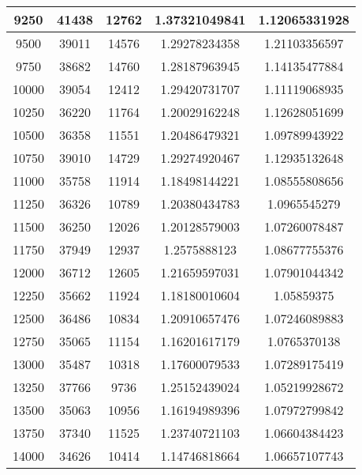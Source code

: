\begin{table}[H]
\begin{tabular}{|c|c|c|c|c|}
		9250    & 41438        & 12762        & 1.37321049841         &  1.12065331928 \\ \hline
		9500    & 39011        & 14576        & 1.29278234358         &  1.21103356597 \\ \hline
		9750    & 38682        & 14760        & 1.28187963945         &  1.14135477884 \\ \hline
		10000   & 39054        & 12412        & 1.29420731707         &  1.11119068935 \\ \hline
		10250   & 36220        & 11764        & 1.20029162248         &  1.12628051699 \\ \hline
		10500   & 36358        & 11551        & 1.20486479321         &  1.09789943922 \\ \hline
		10750   & 39010        & 14729        & 1.29274920467         &  1.12935132648 \\ \hline
		11000   & 35758        & 11914        & 1.18498144221         &  1.08555808656 \\ \hline
		11250   & 36326        & 10789        & 1.20380434783         &  1.0965545279  \\ \hline
		11500   & 36250        & 12026        & 1.20128579003         &  1.07260078487 \\ \hline
		11750   & 37949        & 12937        & 1.2575888123          &  1.08677755376 \\ \hline
		12000   & 36712        & 12605        & 1.21659597031         &  1.07901044342 \\ \hline
		12250   & 35662        & 11924        & 1.18180010604         &  1.05859375    \\ \hline
		12500   & 36486        & 10834        & 1.20910657476         &  1.07246089883 \\ \hline
		12750   & 35065        & 11154        & 1.16201617179         &  1.0765370138  \\ \hline
		13000   & 35487        & 10318        & 1.17600079533         &  1.07289175419 \\ \hline
		13250   & 37766        & 9736         & 1.25152439024         &  1.05219928672 \\ \hline
		13500   & 35063        & 10956        & 1.16194989396         &  1.07972799842 \\ \hline
		13750   & 37340        & 11525        & 1.23740721103         &  1.06604384423 \\ \hline
		14000   & 34626        & 10414        & 1.14746818664         &  1.06657107743 \\ \hline

\end{tabular}
\end{table}
